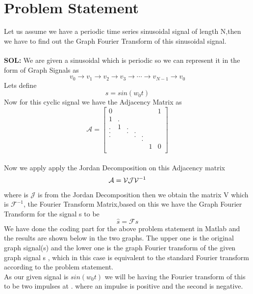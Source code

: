 \documentclass[12pt,onecolumn]{article}
\begin{document}
\section{Problem Statement}
Let us assume we have a periodic time series sinusoidal  signal of length N,then we have to find out the Graph Fourier Transform of this sinusoidal signal.
\\ \\
\newline
\textbf{SOL:} We are given a sinusoidal which is periodic so we can represent it in the form of Graph Signals as 
\begin{equation*}
    v_{0}\to v_{1}\to v_{2}\to v_{3}\to \cdots \to v_{N-1}\to v_{0} 
\end{equation*}
Lets define 
\begin{equation*}
    s = sin(w_{0}t) 
\end{equation*}
Now for this cyclic signal we have the Adjacency Matrix as
\\
\begin{equation*}
\mathcal{A} = 
\begin{bmatrix}
0 & \ & \ & \ & \ & \ & 1 \\
1 & . & \ & \ & \ & \ & \ \\
. & 1 & . & \ & \ & \ & \ \\
. & \ & . & . & \ & \ & \ \\
. & \ & \ & . & . & \ & \ \\
\ & \ & \ & \ & . & \ & \ \\
\ & \ & \ & \ & \ & 1 & 0 \\
\end{bmatrix}
\end{equation*}
\newline \\
Now we apply apply the Jordan Decomposition on this Adjacency matrix
\begin{equation*}
    \mathcal{A} = \mathcal{V} \mathcal{J} \mathcal{V}^{-1} \\
\end{equation*}
where is $\mathcal{J}$ is from the Jordan Decomposition then we obtain the matrix V which is $\mathcal{F}^{-1}$, the Fourier Transform Matrix,based on this we have the Graph Fourier Transform for the signal s to be 
\begin{equation*}
    \hat{s} = \mathcal{F}s
\end{equation*}
We have done the coding part for the above problem statement in Matlab and the results are shown below in the two graphs. The upper one is the original graph signal(s) and the lower one is the graph Fourier transform of the given graph signal s , which in this case is equivalent to the standard Fourier transform  according to the problem statement.\\
As our given signal is $ sin(w_{0}t) $ we will be having the Fourier transform of this to be two impulses at . where an impulse is positive and the second is negative.
\end{document}
